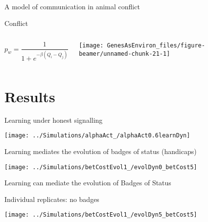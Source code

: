 \documentclass[
  ignorenonframetext,
]{beamer}
\begin{document}
\begin{frame}{A model of communication in animal conflict}
\begin{block}{Conflict}
\begin{columns}
\begin{equation*}
p_w=\frac{1}{1+e^{-\beta(Q_i-Q_j)}}
\end{equation*}




\begin{center}\texttt{[image: GenesAsEnviron\_files/figure-beamer/unnamed-chunk-21-1]} \end{center}

\end{columns}

\end{block}

\end{frame}

\hypertarget{results}{%
\section{Results}\label{results}}

\begin{frame}{Learning under honest signalling}
\protect\hypertarget{learning-under-honest-signalling}{}

\pause

\begin{center}\texttt{[image: ../Simulations/alphaAct\_/alphaAct0.6learnDyn]} \end{center}

\end{frame}

\begin{frame}{Learning mediates the evolution of badges of status
(handicaps)}
\protect\hypertarget{learning-mediates-the-evolution-of-badges-of-status-handicaps}{}

\begin{center}\texttt{[image: ../Simulations/betCostEvol1\_/evolDyn0\_betCost5]} \end{center}

\end{frame}

\begin{frame}{Learning can mediate the evolution of Badges of Status}
\protect\hypertarget{learning-can-mediate-the-evolution-of-badges-of-status}{}

\begin{block}{Individual replicates: no badges}

\begin{center}\texttt{[image: ../Simulations/betCostEvol1\_/evolDyn5\_betCost5]} \end{center}

\end{block}

\end{frame}
\end{document}
